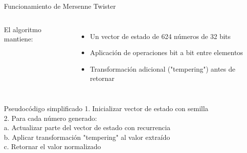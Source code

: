 \documentclass[aspectratio=169]{beamer}
\begin{document}
\begin{frame}{Funcionamiento de Mersenne Twister}
    \begin{columns}
        El algoritmo mantiene:
        \begin{itemize}
            \item Un vector de estado de 624 números de 32 bits
            \item Aplicación de operaciones bit a bit entre elementos
            \item Transformación adicional ("tempering") antes de retornar
        \end{itemize}
        
    \end{columns}
    
    \begin{exampleblock}{Pseudocódigo simplificado}
        1. Inicializar vector de estado con semilla\\
        2. Para cada número generado:\\
        \hspace*{1cm} a. Actualizar parte del vector de estado con recurrencia\\
        \hspace*{1cm} b. Aplicar transformación "tempering" al valor extraído\\
        \hspace*{1cm} c. Retornar el valor normalizado
    \end{exampleblock}
\end{frame}
\end{document}
